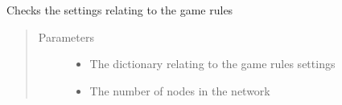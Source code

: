 \documentclass[letterpaper,10pt,english]{sphinxmanual}
\begin{document}
\begin{fulllineitems}
\label{\detokenize{source/yawning_titan.envs.generic.helpers:yawning_titan.envs.generic.helpers.environment_input_validation.check_game_rules}}
\sphinxAtStartPar
Checks the settings relating to the game rules
\begin{quote}\begin{description}
\item[{Parameters}] \leavevmode\begin{itemize}
\item {}
\sphinxAtStartPar
{} \textendash{} The dictionary relating to the game rules settings

\item {}
\sphinxAtStartPar
{} \textendash{} The number of nodes in the network

\end{itemize}

\end{description}\end{quote}

\end{fulllineitems}

\end{document}
